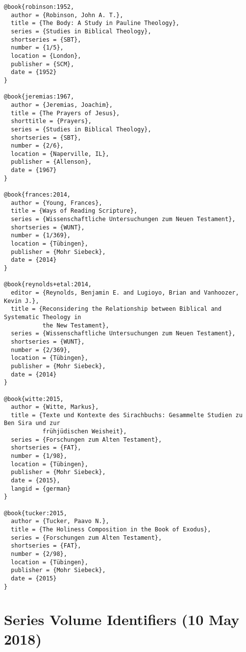 \documentclass[a4paper]{article}
\begin{document}
\begin{verbatim}
@book{robinson:1952,
  author = {Robinson, John A. T.},
  title = {The Body: A Study in Pauline Theology},
  series = {Studies in Biblical Theology},
  shortseries = {SBT},
  number = {1/5},
  location = {London},
  publisher = {SCM},
  date = {1952}
}

@book{jeremias:1967,
  author = {Jeremias, Joachim},
  title = {The Prayers of Jesus},
  shorttitle = {Prayers},
  series = {Studies in Biblical Theology},
  shortseries = {SBT},
  number = {2/6},
  location = {Naperville, IL},
  publisher = {Allenson},
  date = {1967}
}

@book{frances:2014,
  author = {Young, Frances},
  title = {Ways of Reading Scripture},
  series = {Wissenschaftliche Untersuchungen zum Neuen Testament},
  shortseries = {WUNT},
  number = {1/369},
  location = {Tübingen},
  publisher = {Mohr Siebeck},
  date = {2014}
}

@book{reynolds+etal:2014,
  editor = {Reynolds, Benjamin E. and Lugioyo, Brian and Vanhoozer, Kevin J.},
  title = {Reconsidering the Relationship between Biblical and Systematic Theology in
           the New Testament},
  series = {Wissenschaftliche Untersuchungen zum Neuen Testament},
  shortseries = {WUNT},
  number = {2/369},
  location = {Tübingen},
  publisher = {Mohr Siebeck},
  date = {2014}
}

@book{witte:2015,
  author = {Witte, Markus},
  title = {Texte und Kontexte des Sirachbuchs: Gesammelte Studien zu Ben Sira und zur
           frühjüdischen Weisheit},
  series = {Forschungen zum Alten Testament},
  shortseries = {FAT},
  number = {1/98},
  location = {Tübingen},
  publisher = {Mohr Siebeck},
  date = {2015},
  langid = {german}
}

@book{tucker:2015,
  author = {Tucker, Paavo N.},
  title = {The Holiness Composition in the Book of Exodus},
  series = {Forschungen zum Alten Testament},
  shortseries = {FAT},
  number = {2/98},
  location = {Tübingen},
  publisher = {Mohr Siebeck},
  date = {2015}
}
\end{verbatim}

\begin{verbcite}
  \nocite{robinson:1952, jeremias:1967, frances:2014, reynolds+etal:2014,
    witte:2015, tucker:2015}
\end{verbcite}
\exampleabbreviations
\examplebibliography
{}

\section{Series Volume Identifiers (10 May 2018)}
\end{document}

